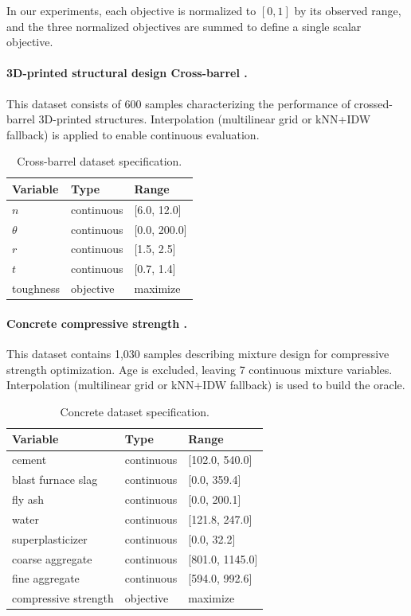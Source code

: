 \documentclass{article} %
\begin{document}
In our experiments, each objective is normalized to $[0,1]$ by its observed range, 
and the three normalized objectives are summed to define a single scalar objective.

\paragraph{3D-printed structural design Cross-barrel \citep{gongora2020bayesiancross}.}
This dataset consists of 600 samples characterizing the performance of crossed-barrel 3D-printed structures.  
Interpolation (multilinear grid or kNN+IDW fallback) is applied to enable continuous evaluation.

\begin{table}[h]
\centering
\caption{Cross-barrel dataset specification.}
\label{tab:crossbarrel}
\begin{tabular}{lll}
\toprule
Variable & Type & Range \\
\midrule
$n$ & continuous & [6.0, 12.0] \\
$\theta$ & continuous & [0.0, 200.0] \\
$r$ & continuous & [1.5, 2.5] \\
$t$ & continuous & [0.7, 1.4] \\
\midrule
toughness & objective & maximize \\
\bottomrule
\end{tabular}
\end{table}

\paragraph{Concrete compressive strength \citep{concrete}.}
This dataset contains 1,030 samples describing mixture design for compressive strength optimization.  
Age is excluded, leaving 7 continuous mixture variables.  
Interpolation (multilinear grid or kNN+IDW fallback) is used to build the oracle.

\begin{table}[t]
\centering
\caption{Concrete dataset specification.}
\label{tab:concrete}
\begin{tabular}{lll}
\toprule
Variable & Type & Range \\
\midrule
cement & continuous & [102.0, 540.0] \\
blast furnace slag & continuous & [0.0, 359.4] \\
fly ash & continuous & [0.0, 200.1] \\
water & continuous & [121.8, 247.0] \\
superplasticizer & continuous & [0.0, 32.2] \\
coarse aggregate & continuous & [801.0, 1145.0] \\
fine aggregate & continuous & [594.0, 992.6] \\
\midrule
compressive strength & objective & maximize \\
\bottomrule
\end{tabular}
\end{table}
\end{document}
